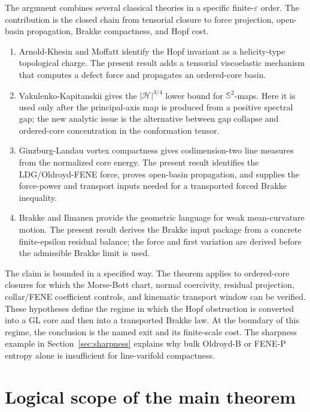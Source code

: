 \documentclass[11pt]{article}
\theoremstyle{definition}
\newcommand{\Sph}{\mathbb S}
\newcommand{\eps}{\varepsilon}
\newcommand{\Hopf}{\mathcal H}
\begin{document}
The argument combines several classical theories in a specific finite-\(\eps\)
order.  The contribution is the closed chain from tensorial closure to force
projection, open-basin propagation, Brakke compactness, and Hopf cost.

\begin{enumerate}[label=(\roman*)]
\item Arnold-Khesin and Moffatt identify the Hopf invariant as a helicity-type
topological charge.  The present result adds a tensorial viscoelastic mechanism that
computes a defect force and propagates an ordered-core basin.

\item Vakulenko-Kapitanskii gives the \(|\Hopf|^{3/4}\) lower bound for
\(\Sph^2\)-maps.  Here it is used only after the principal-axis map is produced
from a positive spectral gap; the new analytic issue is the alternative between
gap collapse and ordered-core concentration in the conformation tensor.

\item Ginzburg-Landau vortex compactness gives codimension-two line measures
from the normalized core energy.  The present result identifies the LDG/Oldroyd-FENE
force, proves open-basin propagation, and supplies the force-power and
transport inputs needed for a transported forced Brakke inequality.

\item Brakke and Ilmanen provide the geometric language for weak mean-curvature
motion.  The present result derives the Brakke input package from a concrete
finite-epsilon residual balance; the force and first variation are derived before the admissible Brakke limit is used.
\end{enumerate}

The claim is bounded in a specified way.  The theorem applies to ordered-core
closures for which the Morse-Bott chart, normal coercivity, residual projection,
collar/FENE coefficient controls, and kinematic transport window can be
verified.  These hypotheses define the regime in which the Hopf obstruction is
converted into a GL core and then into a transported Brakke law.  At the
boundary of this regime, the conclusion is the named exit and its finite-scale
cost.  The sharpness example in Section~\ref{sec:sharpness} explains why bulk
Oldroyd-B or FENE-P entropy alone is insufficient for line-varifold compactness.

\section{Logical scope of the main theorem}
\label{sec:downgrades}
\end{document}
